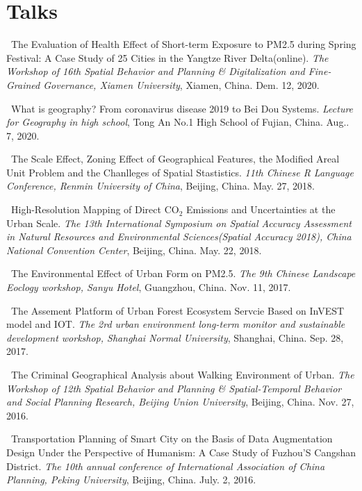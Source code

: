 \section*{Talks}
\begin{etaremune}
\item
    \Shaoqing\
    The Evaluation of Health Effect of Short-term Exposure to PM2.5 during Spring Festival: A Case Study of 25 Cities in the Yangtze River Delta(online).
    \textit{The Workshop of 16th Spatial Behavior and Planning \& Digitalization and Fine-Grained Governance, Xiamen University}, Xiamen, China.
    Dem. 12, 2020.
    \invited
\item
    \Shaoqing\
    What is geography? From coronavirus disease 2019 to Bei Dou Systems.
    \textit{Lecture for Geography in high school}, Tong An No.1 High School of Fujian, China.
    Aug.. 7, 2020.
\item
    \Shaoqing\
    The Scale Effect, Zoning Effect of Geographical Features, the Modified Areal Unit Problem and the Chanlleges of Spatial Stastistics.
    \textit{11th Chinese R Language Conference, Renmin University of China}, Beijing, China.
    May. 27, 2018.
\item
    \Shaoqing\
    High-Resolution Mapping of Direct CO$_2$ Emissions and Uncertainties at the Urban Scale.
    \textit{The 13th International Symposium on Spatial Accuracy Assessment in Natural Resources and Environmental Sciences(Spatial Accuracy 2018), China National Convention Center}, Beijing, China.
    May. 22, 2018.
\item
    \Shaoqing\
    The Environmental Effect of Urban Form on PM2.5. 
    \textit{The 9th Chinese Landscape Eoclogy workshop, Sanyu Hotel}, Guangzhou, China.
    Nov. 11, 2017.
\item
    \Shaoqing\
    The Assement Platform of Urban Forest Ecosystem Servcie Based on InVEST model and IOT.
    \textit{The 2rd urban environment long-term monitor and sustainable development workshop, Shanghai Normal University}, Shanghai, China.
    Sep. 28, 2017.
    \invited
\item
    \Shaoqing\
    The Criminal Geographical Analysis about Walking Environment of Urban.
    \textit{The Workshop of 12th Spatial Behavior and Planning \& Spatial-Temporal Behavior and Social Planning Research, Beijing Union University}, Beijing, China.
    Nov. 27, 2016.
\item
    \Shaoqing\
    Transportation Planning of Smart City on the Basis of Data Augmentation Design Under the Perspective of Humanism: A Case Study of Fuzhou’S Cangshan District.
    \textit{The 10th annual conference of International Association of China Planning, Peking University}, Beijing, China.
    July. 2, 2016.
\end{etaremune}
